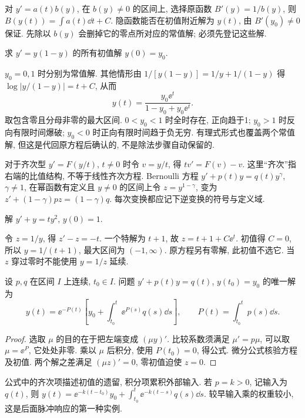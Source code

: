 对 $y'=a(t)b(y)$, 在 $b(y)\ne0$ 的区间上, 选择原函数 $B'(y)=1/b(y)$, 则 $B(y(t))=\int a(t)\dd t+C$. 隐函数能否在初值附近解为 $y(t)$, 由 $B'(y_0)\ne0$ 保证. 先除以 $b(y)$ 会删掉它的零点所对应的常值解; 必须先登记这些解.
\begin{example}求 $y'=y(1-y)$ 的所有初值解 $y(0)=y_0$.\end{example}
\begin{solution}
$y_0=0,1$ 时分别为常值解. 其他情形由 $1/[y(1-y)]=1/y+1/(1-y)$ 得 $\log|y/(1-y)|=t+C$, 从而
\[
y(t)=\frac{y_0\ee^t}{1-y_0+y_0\ee^t}.
\]
取包含零且分母非零的最大区间. $0<y_0<1$ 时全时存在, 正向趋于1; $y_0>1$ 时反向有限时间爆破; $y_0<0$ 时正向有限时间趋于负无穷. 有理式形式也覆盖两个常值解, 但这是代回原方程后确认的, 不是除法步骤自动保留的.
\end{solution}
对于齐次型 $y'=F(y/t)$, $t\ne0$ 时令 $v=y/t$, 得 $t v'=F(v)-v$. 这里“齐次”指右端的比值结构, 不等于线性齐次方程. Bernoulli 方程 $y'+p(t)y=q(t)y^\gamma$, $\gamma\ne1$, 在幂函数有定义且 $y\ne0$ 的区间上令 $z=y^{1-\gamma}$, 变为 $z'+(1-\gamma)pz=(1-\gamma)q$. 每次变换都应记下逆变换的符号与定义域.
\begin{example}解 $y'+y=t y^2$, $y(0)=1$.\end{example}
\begin{solution}
令 $z=1/y$, 得 $z'-z=-t$. 一个特解为 $t+1$, 故 $z=t+1+C\ee^t$. 初值得 $C=0$, 所以 $y=1/(t+1)$, 最大区间为 $(-1,\infty)$. 原方程另有零解, 此初值不选它. 当 $z$ 穿过零时不能使用 $y=1/z$ 延续.
\end{solution}
\begin{theorem}[积分因子]\label{thm:firstlinear}
设 $p,q$ 在区间 $I$ 上连续, $t_0\in I$. 问题 $y'+p(t)y=q(t)$, $y(t_0)=y_0$ 的唯一解为
\begin{equation}\label{eq:firstlinear}
y(t)=\ee^{-P(t)}\left[y_0+\int_{t_0}^t\ee^{P(s)}q(s)\dd s\right],\qquad P(t)=\int_{t_0}^t p(s)\dd s.
\end{equation}
\end{theorem}
\begin{proof}
选取 $\mu$ 的目的在于把左端变成 $(\mu y)'$. 比较系数须满足 $\mu'=p\mu$, 可以取 $\mu=\ee^P$, 它处处非零. 乘以 $\mu$ 后积分, 使用 $P(t_0)=0$, 得公式. 微分公式核验方程及初值. 两个解之差满足 $(\mu z)'=0$, 零初值迫使 $z=0$.
\end{proof}
公式中的齐次项描述初值的遗留, 积分项累积外部输入. 若 $p=k>0$, 记输入为 $q(t)$, 则 $y(t)=\ee^{-k(t-t_0)}y_0+\int_{t_0}^t\ee^{-k(t-s)}q(s)\dd s$. 较早输入乘的权重较小, 这是后面脉冲响应的第一种实例.
